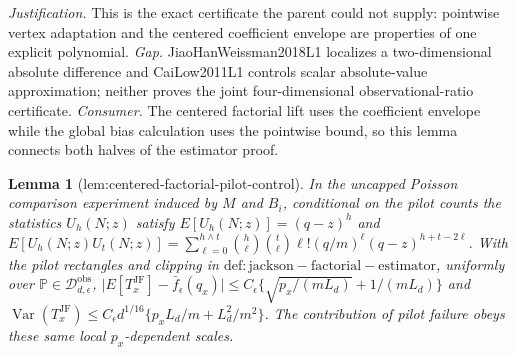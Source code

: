 \documentclass{article}
\newtheorem{lemma}{Lemma}
\begin{document}
\par\smallskip\noindent \textit{Justification.} This is the exact certificate the parent could not supply: pointwise vertex adaptation and the centered coefficient envelope are properties of one explicit polynomial. \textit{Gap.} JiaoHanWeissman2018L1 localizes a two-dimensional absolute difference and CaiLow2011L1 controls scalar absolute-value approximation; neither proves the joint four-dimensional observational-ratio certificate. \textit{Consumer.} The centered factorial lift uses the coefficient envelope while the global bias calculation uses the pointwise bound, so this lemma connects both halves of the estimator proof.

\begin{lemma}[lem:centered-factorial-pilot-control]\label{lem:centered-factorial-pilot-control}
In the uncapped Poisson comparison experiment induced by \(M\) and \(B_i\), conditional on the pilot counts the statistics \(U_h(N;z)\) satisfy \(E[U_h(N;z)]=(q-z)^h\) and \(E[U_h(N;z)U_t(N;z)]=\sum_{\ell=0}^{h\wedge t}\binom h\ell\binom t\ell\ell!(q/m)^\ell(q-z)^{h+t-2\ell}\). With the pilot rectangles and clipping in \(\mathrm{def:jackson-factorial-estimator}\), uniformly over \(\mathbb P\in\mathcal D_{d,\epsilon}^{\mathrm{obs}}\), \(\lvert E[T_x^{\mathrm{JF}}]-\bar f_\epsilon(q_x)\rvert\leq C_\epsilon\{\sqrt{p_x/(mL_d)}+1/(mL_d)\}\) and \(\operatorname{Var}(T_x^{\mathrm{JF}})\leq C_\epsilon d^{1/16}\{p_xL_d/m+L_d^2/m^2\}\). The contribution of pilot failure obeys these same local \(p_x\)-dependent scales.
\end{lemma}
\end{document}
